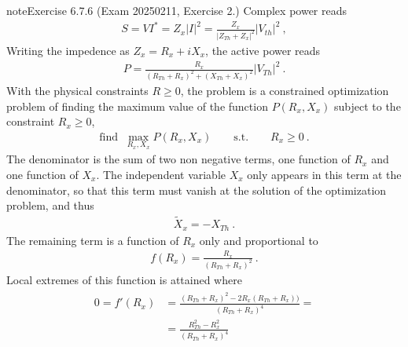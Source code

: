 \documentclass[letterpaper,10pt,english]{jupyterBook}
\begin{document}
\begin{sphinxadmonition}{note}{Exercise 6.7.6 (Exam 2025\sphinxhyphen{}02\sphinxhyphen{}11, Exercise 2.)}
\sphinxAtStartPar
{} Complex power reads
\begin{equation*}
\begin{split}S = V I^* = Z_x |I|^2 = \frac{Z_x}{|Z_{Th} + Z_x|^2} |V_{th}|^2 \ ,\end{split}
\end{equation*}
\sphinxAtStartPar
Writing the impedence as \(Z_x = R_x + i X_x\), the active power reads
\begin{equation*}
\begin{split}P = \frac{ R_x }{ (R_{Th} + R_x)^2 + (X_{Th} + X_x)^2} |V_{Th}|^2 \ .\end{split}
\end{equation*}
\sphinxAtStartPar
With the physical constraints \(R \ge 0\), the problem is a constrained optimization problem of finding the maximum value of the function \(P(R_x, X_x)\) subject to the constraint \(R_x \ge 0\),
\begin{equation*}
\begin{split}\text{find } \ \max_{R_x, X_x} P(R_x, X_x) \qquad \text{s.t.} \qquad R_x \ge 0 \ .\end{split}
\end{equation*}
\sphinxAtStartPar
The denominator is the sum of two non negative terms, one function of \(R_x\) and one function of \(X_x\). The independent variable \(X_x\) only appears in this term at the denominator, so that this term must vanish at the solution of the optimization problem, and thus
\begin{equation*}
\begin{split}\widetilde{X}_x = - X_{Th} \ .\end{split}
\end{equation*}
\sphinxAtStartPar
The remaining term is a function of \(R_x\) only and proportional to
\begin{equation*}
\begin{split}f(R_x) = \frac{R_x}{(R_{Th} + R_x)^2} \ .\end{split}
\end{equation*}
\sphinxAtStartPar
Local extremes of this function is attained where
\begin{equation*}
\begin{split}\begin{aligned}
  0 = f'(R_x) 
  & = \frac{(R_{Th} + R_x)^2 - 2 R_x (R_{Th} + R_x))}{(R_{Th} + R_x)^4} = \\
  & = \frac{R_{Th}^2 - R_x^2 }{(R_{Th} + R_x)^4} \\
\end{aligned}\end{split}

\end{equation*}
\end{sphinxadmonition}
\end{document}
